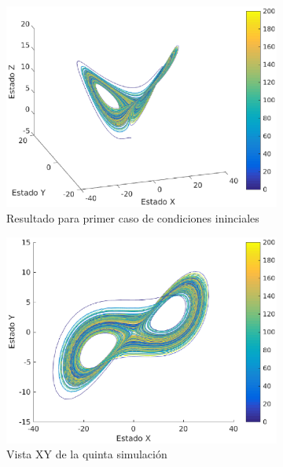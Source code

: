 \documentclass[12pt,letterpaper]{article}
\begin{document}
\begin{figure}
	\centering
	\begin{subfigure}[t]{0.36\textwidth}
		\includegraphics[width=\textwidth]{pictures/quinta_simulacion}
		\caption{Resultado para primer caso de condiciones ininciales}
		\label{fig:simulacion5}
	\end{subfigure}
	\begin{subfigure}[t]{0.36\textwidth}
		\includegraphics[width=\textwidth]{pictures/quinta_simulacion_xy}
		\caption{Vista XY de la quinta simulación}
		\label{fig:simulacion5xy}
	\end{subfigure}
        \vfill
        \begin{subfigure}[b]{0.36\textwidth}

\end{subfigure}
\end{figure}
\end{document}

